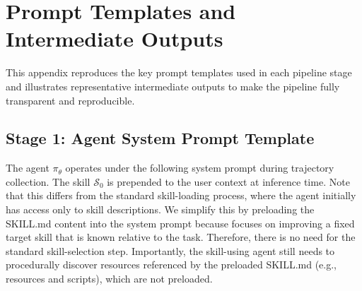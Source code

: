 \begin{tcolorbox}[
    title={\textbf{Skill Creator Baseline Prompt: Creation}},
    colback=gray!5, colframe=gray!50, fonttitle=\small\bfseries,
    breakable, left=4pt, right=4pt, top=4pt, bottom=4pt
]
\small\ttfamily\raggedright\noindent{}
\end{tcolorbox}

\section{Prompt Templates and Intermediate Outputs}
\label{app:prompts}


This appendix reproduces the key prompt templates used in each pipeline stage and illustrates representative intermediate outputs to make the pipeline fully transparent and reproducible.

\subsection{Stage 1: Agent System Prompt Template}
\label{app:stage1_prompt}

The agent $\pi_\theta$ operates under the following system prompt during trajectory collection.
The skill $\mathcal{S}_0$ is prepended to the user context at inference time. Note that this differs from the standard skill-loading process, where the agent initially has access only to skill descriptions. We simplify this by preloading the SKILL.md content into the system prompt because \systemname{} focuses on improving a fixed target skill that is known relative to the task. Therefore, there is no need for the standard skill-selection step. Importantly, the \systemname{} skill-using agent still needs to procedurally discover resources referenced by the preloaded SKILL.md (e.g., resources and scripts), which are not preloaded.

